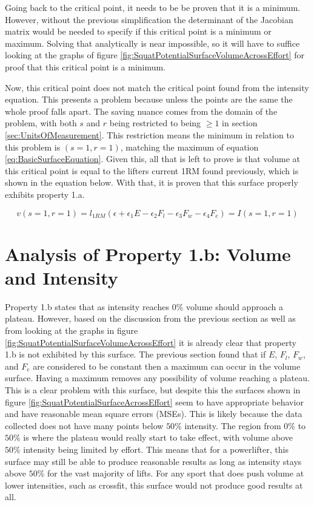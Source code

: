Going back to the critical point, it needs to be be proven that it is a minimum. However, without the previous simplification the determinant of the Jacobian matrix would be needed to specify if this critical point is a minimum or maximum. Solving that analytically is near impossible, so it will have to suffice looking at the graphs of figure \ref{fig:SquatPotentialSurfaceVolumeAcrossEffort} for proof that this critical point is a minimum. 

Now, this critical point does not match the critical point found from the intensity equation. This presents a problem because unless the points are the same the whole proof falls apart. The saving nuance comes from the domain of the problem, with both $s$ and $r$ being restricted to being $\ge 1$ in section \ref{sec:UnitsOfMeasurement}. This restriction means the minimum in relation to this problem is $(s=1,r=1)$, matching the maximum of equation \ref{eq:BasicSurfaceEquation}. Given this, all that is left to prove is that volume at this critical point is equal to the lifters current 1RM found previously, which is shown in the equation below. With that, it is proven that this surface properly exhibits property 1.a.

\begin{equation}
	v(s=1,r=1)=l_{1RM} \left(
    			\epsilon+
    			\epsilon_1 E-
    			\epsilon_2 F_l-
    			\epsilon_3 F_w-
    			\epsilon_4 F_e 
    	\right) = I(s=1,r=1)
\end{equation}

\section{Analysis of Property 1.b: Volume and Intensity}
\label{sec:PotentialSurfaceAnalysisOfProperty1b}

Property 1.b states that as intensity reaches $0\%$ volume should approach a plateau. However, based on the discussion from the previous section as well as from looking at the graphs in figure \ref{fig:SquatPotentialSurfaceVolumeAcrossEffort} it is already clear that property 1.b is not exhibited by this surface. The previous section found that if $E$, $F_l$, $F_w$, and $F_e$ are considered to be constant then a maximum can occur in the volume surface. Having a maximum removes any possibility of volume reaching a plateau. This is a clear problem with this surface, but despite this the surfaces shown in figure \ref{fig:SquatPotentialSurfaceAcrossEffort} seem to have appropriate behavior and have reasonable mean square errors (MSEs). This is likely because the data collected does not have many points below $50\%$ intensity. The region from $0\%$ to $50\%$ is where the plateau would really start to take effect, with volume above $50\%$ intensity being limited by effort. This means that for a powerlifter, this surface may still be able to produce reasonable results as long as intensity stays above $50\%$ for the vast majority of lifts. For any sport that does push volume at lower intensities, such as crossfit, this surface would not produce good results at all.

